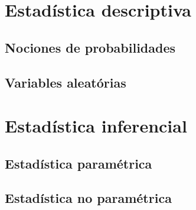 \documentclass[10pt,letterpaper,oneside]{report}
\begin{document}
\chapter{Estadística descriptiva}
  \section{Nociones de probabilidades}
  \section{Variables aleatórias}


\chapter{Estadística inferencial}
  \section{Estadística paramétrica}
  \section{Estadística no paramétrica}
\end{document}

